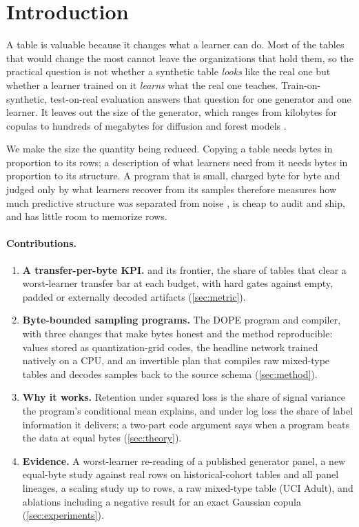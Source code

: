 \documentclass{article}
\theoremstyle{remark}
\begin{document}
\section{Introduction}
\label{sec:intro}

A table is valuable because it changes what a learner can do. Most of the tables that would change the
most cannot leave the organizations that hold them, so the practical question is not whether a
synthetic table \emph{looks} like the real one but whether a learner trained on it \emph{learns} what the
real one teaches. Train-on-synthetic, test-on-real evaluation \citep{esteban2017rcgan,jordon2018measuring}
answers that question for one generator and one learner. It leaves out the size of the generator, which
ranges from kilobytes for copulas \citep{patki2016sdv} to hundreds of megabytes for diffusion and forest
models \citep{zhang2024tabsyn,jolicoeurmartineau2024forestdiffusion}.

We make the size the quantity being reduced. Copying a table needs bytes in proportion to its rows; a
description of what learners need from it needs bytes in proportion to its structure. A program that is
small, charged byte for byte and judged only by what learners recover from its samples therefore measures
how much predictive structure was separated from noise \citep{rissanen1978modeling}, is cheap to audit and
ship, and has little room to memorize rows.

\paragraph{Contributions.}
\begin{enumerate}[leftmargin=1.6em,itemsep=1pt,topsep=2pt]
  \item \textbf{A transfer-per-byte KPI.} \MetricName{} and its frontier, the share of tables that clear
  a worst-learner transfer bar at each budget, with hard gates against empty, padded or externally
  decoded artifacts (\cref{sec:metric}).
  \item \textbf{Byte-bounded sampling programs.} The DOPE program and compiler, with three changes that
  make bytes honest and the method reproducible: values stored as quantization-grid codes, the headline
  network trained natively on a CPU, and an invertible plan that compiles raw mixed-type tables and
  decodes samples back to the source schema (\cref{sec:method}).
  \item \textbf{Why it works.} Retention under squared loss is the share of signal variance the program's
  conditional mean explains, and under log loss the share of label information it delivers; a two-part
  code argument says when a program beats the data at equal bytes (\cref{sec:theory}).
  \item \textbf{Evidence.} A worst-learner re-reading of a published generator panel, a new equal-byte
  study against real rows on \EbLineages{} historical-cohort tables and all \EbPanelLineages{} panel lineages, a
  scaling study up to \EbScaleMaxN{} rows,
  a raw mixed-type table (UCI Adult), and ablations including a negative result for an exact Gaussian
  copula (\cref{sec:experiments}).
\end{enumerate}
\end{document}
